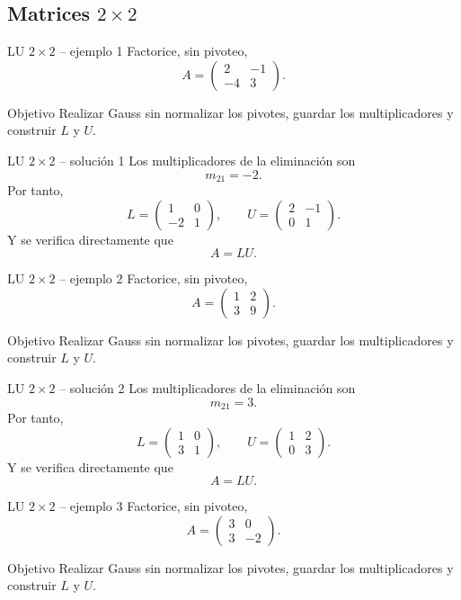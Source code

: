 \documentclass[aspectratio=169,10pt]{beamer}
\begin{document}
\subsection{Matrices $2\times 2$}
\begin{frame}{LU $2\times 2$ -- ejemplo 1}
\small
Factorice, sin pivoteo,
\[
A=\begin{pmatrix}2 & -1\\-4 & 3\end{pmatrix}.
\]
\begin{block}{Objetivo}
Realizar Gauss sin normalizar los pivotes, guardar los multiplicadores y construir $L$ y $U$.
\end{block}
\end{frame}
\begin{frame}{LU $2\times 2$ -- solución 1}
\small
Los multiplicadores de la eliminación son
\[
m_{21}=-2.
\]
Por tanto,
\[
L=\begin{pmatrix}1 & 0\\-2 & 1\end{pmatrix},\qquad U=\begin{pmatrix}2 & -1\\0 & 1\end{pmatrix}.
\]
Y se verifica directamente que
\[
\boxed{A=LU}.
\]
\end{frame}
\begin{frame}{LU $2\times 2$ -- ejemplo 2}
\small
Factorice, sin pivoteo,
\[
A=\begin{pmatrix}1 & 2\\3 & 9\end{pmatrix}.
\]
\begin{block}{Objetivo}
Realizar Gauss sin normalizar los pivotes, guardar los multiplicadores y construir $L$ y $U$.
\end{block}
\end{frame}
\begin{frame}{LU $2\times 2$ -- solución 2}
\small
Los multiplicadores de la eliminación son
\[
m_{21}=3.
\]
Por tanto,
\[
L=\begin{pmatrix}1 & 0\\3 & 1\end{pmatrix},\qquad U=\begin{pmatrix}1 & 2\\0 & 3\end{pmatrix}.
\]
Y se verifica directamente que
\[
\boxed{A=LU}.
\]
\end{frame}
\begin{frame}{LU $2\times 2$ -- ejemplo 3}
\small
Factorice, sin pivoteo,
\[
A=\begin{pmatrix}3 & 0\\3 & -2\end{pmatrix}.
\]
\begin{block}{Objetivo}
Realizar Gauss sin normalizar los pivotes, guardar los multiplicadores y construir $L$ y $U$.
\end{block}
\end{frame}
\end{document}
